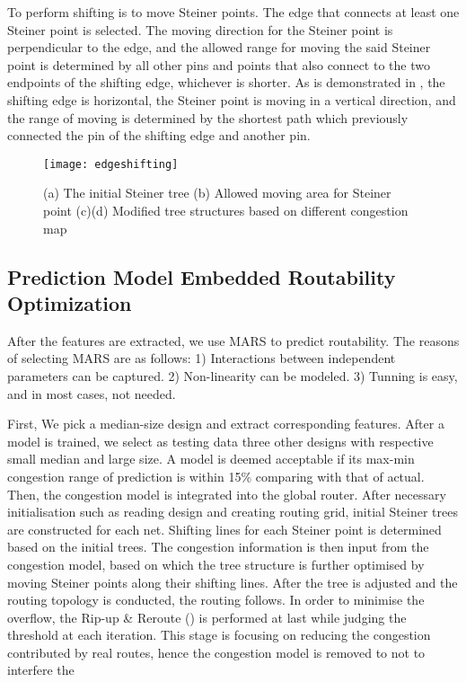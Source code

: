 To perform shifting is to move Steiner points. The edge that connects at least one Steiner point is selected. The moving direction for the Steiner point is perpendicular to the edge, and the allowed range for moving the said Steiner point is determined by all other pins and points that also connect to the two endpoints of the shifting edge, whichever is shorter. As is demonstrated in , the shifting edge is horizontal, the Steiner point is moving in a vertical direction, and the range of moving is determined by the shortest path which previously connected the pin of the shifting edge and another pin. 
\begin{figure}[htbp]
    \centerline{\texttt{[image: edgeshifting]}}
    \caption{(a) The initial Steiner tree (b) Allowed moving area for Steiner point (c)(d) Modified tree structures based on different congestion map}
    \label{fig:edgeshifting}
\end{figure}

\subsection{Prediction Model Embedded Routability Optimization}
After the features are extracted, we use MARS \cite{MARS} to predict routability. The reasons of selecting MARS are as follows: 1) Interactions between independent parameters can be captured. 2) Non-linearity can be modeled. 3) Tunning is easy, and in most cases, not needed. 

First, We pick a median-size design and extract corresponding features. After a model is trained, we select as testing data three other designs with respective small median and large size. A model is deemed acceptable if its max-min congestion range of prediction is within 15\% comparing with that of actual. Then, the congestion model is integrated into the global router. After necessary initialisation such as reading design and creating routing grid, initial Steiner trees are constructed for each net. Shifting lines for each Steiner point is determined based on the initial trees. The congestion information is then input from the congestion model, based on which the tree structure is further optimised by moving Steiner points along their shifting lines. After the tree is adjusted and the routing topology is conducted, the routing follows. In order to minimise the overflow, the Rip-up \& Reroute () is performed at last while judging the threshold at each iteration. This stage is focusing on reducing the congestion contributed by real routes, hence the congestion model is removed to not to interfere the 

